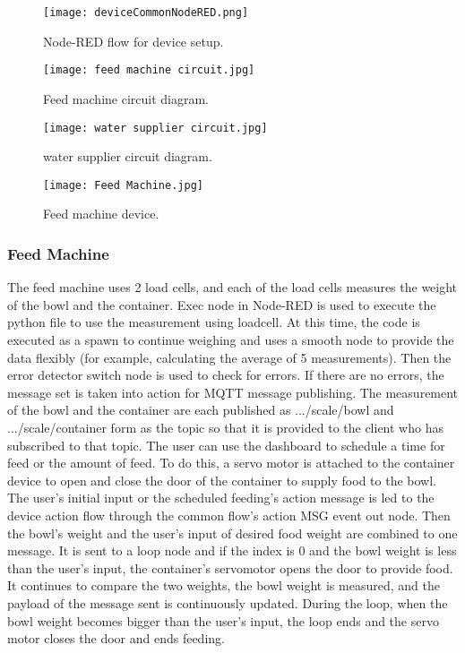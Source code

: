 \documentclass[conference]{IEEEtran}
\begin{document}
\begin{figure}[htbp]
\centerline{\texttt{[image: deviceCommonNodeRED.png]}}
\caption{Node-RED flow for device setup.}
\label{fig}
\end{figure}

\begin{figure}[htbp]
\centerline{\texttt{[image: feed machine circuit.jpg]}}
\caption{Feed machine circuit diagram.}
\label{fig}
\end{figure}

\begin{figure}[htbp]
\centerline{\texttt{[image: water supplier circuit.jpg]}}
\caption{water supplier circuit diagram.}
\label{fig}
\end{figure}

\begin{figure}[htbp]
\centerline{\texttt{[image: Feed Machine.jpg]}}
\caption{Feed machine device.}
\label{fig}
\end{figure}

\subsubsection{Feed Machine}
The feed machine uses 2 load cells, and each of the load cells measures the weight of the bowl
and the container. Exec node in Node-RED is used to execute the python file to use the
measurement using loadcell. At this time, the code is executed as a spawn to continue weighing
and uses a smooth node to provide the data flexibly (for example, calculating the average of 5
measurements). Then the error detector switch node is used to check for errors. If there are no
errors, the message set is taken into action for MQTT message publishing. The measurement of
the bowl and the container are each published as .../scale/bowl and .../scale/container form as the
topic so that it is provided to the client who has subscribed to that topic.
The user can use the dashboard to schedule a time for feed or the amount of feed. To do this, a
servo motor is attached to the container device to open and close the door of the container to
supply food to the bowl. The user’s initial input or the scheduled feeding’s action message is led
to the device action flow through the common flow’s action MSG event out node. Then the
bowl’s weight and the user’s input of desired food weight are combined to one message. It is sent
to a loop node and if the index is 0 and the bowl weight is less than the user’s input, the
container’s servomotor opens the door to provide food. It continues to compare the two weights,
the bowl weight is measured, and the payload of the message sent is continuously updated.
During the loop, when the bowl weight becomes bigger than the user’s input, the loop ends and
the servo motor closes the door and ends feeding.
\end{document}
